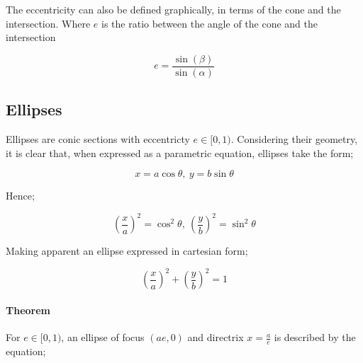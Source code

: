 \documentclass{article}
\begin{document}
\begin{multicols}{2}

\vspace{20pt}

\begin{center}

\end{center}

\noindent The eccentricity can also be defined graphically, in terms of the cone and the intersection. Where \(e\) is the ratio between the angle of the cone and the intersection

\[e=\frac{\sin\left(\beta\right)}{\sin\left(\alpha\right)}\]

\end{multicols}


\subsection{Ellipses}

Ellipses are conic sections with eccentricty $e \in [0,1)$. Considering their
geometry, it is clear that, when expressed as a parametric equation, ellipses
take the form;

\[x = a\cos\theta,\: y = b\sin\theta\]

\noindent Hence;

\[\left(\frac{x}{a}\right)^2 = \cos^2\theta,\: \left(\frac{y}{b}\right)^2 =
\sin^2\theta\]

\noindent Making apparent an ellipse expressed in cartesian form;

\[\left(\frac{x}{a}\right)^2 + \left(\frac{y}{b}\right)^2 = 1\]

\paragraph{Theorem} For $e \in [0,1)$, an ellipse of focus $(ae, 0)$ and
directrix $x = \frac{a}{e}$ is described by the equation;
\end{document}
